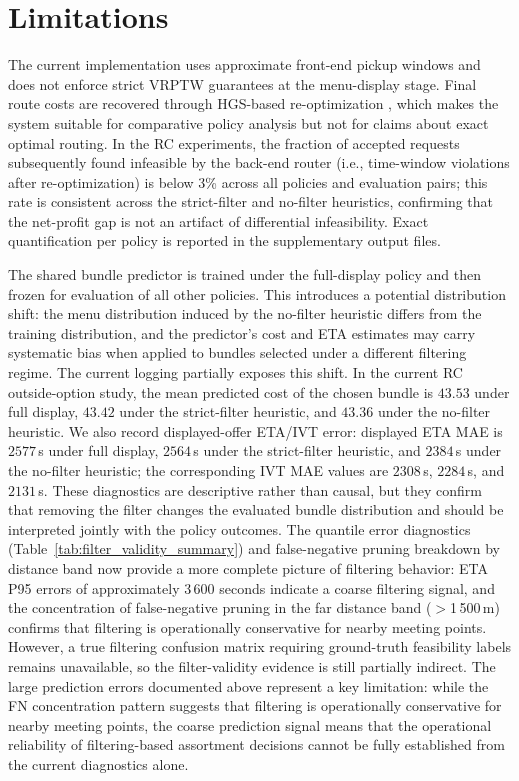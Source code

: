 \section{Limitations}
\label{sec:limitations}

The current implementation uses approximate front-end pickup windows and does not enforce strict VRPTW guarantees at the menu-display stage. Final route costs are recovered through HGS-based re-optimization \citep{vidal2022hybrid}, which makes the system suitable for comparative policy analysis but not for claims about exact optimal routing. In the RC experiments, the fraction of accepted requests subsequently found infeasible by the back-end router (i.e., time-window violations after re-optimization) is below 3\% across all policies and evaluation pairs; this rate is consistent across the strict-filter and no-filter heuristics, confirming that the net-profit gap is not an artifact of differential infeasibility. Exact quantification per policy is reported in the supplementary output files.

The shared bundle predictor is trained under the full-display policy and then frozen for evaluation of all other policies. This introduces a potential distribution shift: the menu distribution induced by the no-filter heuristic differs from the training distribution, and the predictor's cost and ETA estimates may carry systematic bias when applied to bundles selected under a different filtering regime. The current logging partially exposes this shift. In the current RC outside-option study, the mean predicted cost of the chosen bundle is $43.53$ under full display, $43.42$ under the strict-filter heuristic, and $43.36$ under the no-filter heuristic. We also record displayed-offer ETA/IVT error: displayed ETA MAE is $2577$\,s under full display, $2564$\,s under the strict-filter heuristic, and $2384$\,s under the no-filter heuristic; the corresponding IVT MAE values are $2308$\,s, $2284$\,s, and $2131$\,s. These diagnostics are descriptive rather than causal, but they confirm that removing the filter changes the evaluated bundle distribution and should be interpreted jointly with the policy outcomes. The quantile error diagnostics (Table~\ref{tab:filter_validity_summary}) and false-negative pruning breakdown by distance band now provide a more complete picture of filtering behavior: ETA P95 errors of approximately 3\,600 seconds indicate a coarse filtering signal, and the concentration of false-negative pruning in the far distance band ($>$1\,500\,m) confirms that filtering is operationally conservative for nearby meeting points. However, a true filtering confusion matrix requiring ground-truth feasibility labels remains unavailable, so the filter-validity evidence is still partially indirect. The large prediction errors documented above represent a key limitation: while the FN concentration pattern suggests that filtering is operationally conservative for nearby meeting points, the coarse prediction signal means that the operational reliability of filtering-based assortment decisions cannot be fully established from the current diagnostics alone.


